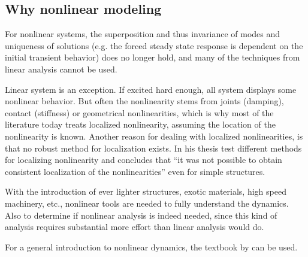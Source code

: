 




\subsection{Why nonlinear modeling}
\label{sec:why-nonl-model}

For nonlinear systems, the superposition and thus invariance of modes and
uniqueness of solutions (e.g. the forced steady state response is dependent on
the initial transient behavior) does no longer hold, and many of the techniques
from linear analysis cannot be used.

Linear system is an exception. If excited hard enough, all system displays some
nonlinear behavior. But often the nonlinearity stems from joints (damping),
contact (stiffness) or geometrical nonlinearities, which is why most of the
literature today treats localized nonlinearity, assuming the location of the
nonlinearity is known.
Another reason for dealing with localized nonlinearities, is that no robust
method for localization exists. In his thesis \textcite{kragh2010a} test different
methods for localizing nonlinearity and concludes that ``it was not possible to
obtain consistent localization of the nonlinearities'' even for simple structures.

With the introduction of ever lighter structures, exotic materials, high speed
machinery, etc., nonlinear tools are needed to fully understand the dynamics.
Also to determine if nonlinear analysis is indeed needed, since this kind of
analysis requires substantial more effort than linear analysis would do.

For a general introduction to nonlinear dynamics, the textbook by
\textcite{juel2003a} can be used.



